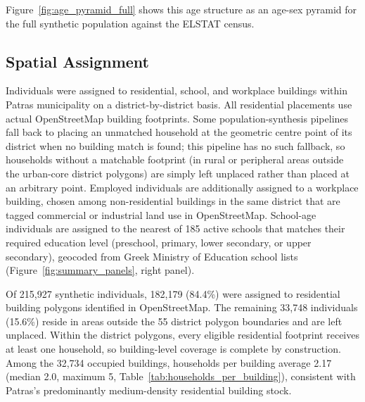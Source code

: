 \documentclass{article}
\begin{document}
Figure~\ref{fig:age_pyramid_full} shows this age structure as an age-sex pyramid for the full synthetic population against the ELSTAT census.

\subsection{Spatial Assignment}\label{spatial-assignment}

Individuals were assigned to residential, school, and workplace buildings within Patras municipality on a district-by-district basis. All residential placements use actual OpenStreetMap building footprints. Some population-synthesis pipelines fall back to placing an unmatched household at the geometric centre point of its district when no building match is found; this pipeline has no such fallback, so households without a matchable footprint (in rural or peripheral areas outside the urban-core district polygons) are simply left unplaced rather than placed at an arbitrary point. Employed individuals are additionally assigned to a workplace building, chosen among non-residential buildings in the same district that are tagged commercial or industrial land use in OpenStreetMap. School-age individuals are assigned to the nearest of 185 active schools that matches their required education level (preschool, primary, lower secondary, or upper secondary), geocoded from Greek Ministry of Education school lists (Figure~\ref{fig:summary_panels}, right panel).

Of 215,927 synthetic individuals, 182,179 (84.4\%) were assigned to residential building polygons identified in OpenStreetMap. The remaining 33,748 individuals (15.6\%) reside in areas outside the 55 district polygon boundaries and are left unplaced. Within the district polygons, every eligible residential footprint receives at least one household, so building-level coverage is complete by construction. Among the 32,734 occupied buildings, households per building average 2.17 (median 2.0, maximum 5, Table~\ref{tab:households_per_building}), consistent with Patras's predominantly medium-density residential building stock.
\end{document}
